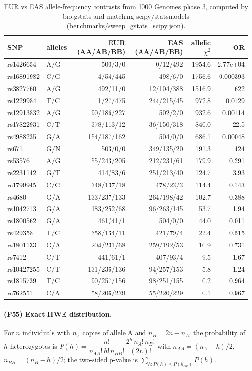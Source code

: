 \begin{table}[h]\centering\small\begin{tabular}{llrrrr}\hline SNP & alleles & EUR (AA/AB/BB) & EAS (AA/AB/BB) & allelic $\chi^2$ & OR\\\hline
rs1426654 & A/G & 500/3/0 & 0/12/492 & 1954.6 & 2.77e+04\\
rs16891982 & C/G & 4/54/445 & 498/6/0 & 1756.6 & 0.000393\\
rs3827760 & A/G & 492/11/0 & 12/104/388 & 1516.9 & 622\\
rs1229984 & T/C & 1/27/475 & 244/215/45 & 972.8 & 0.0129\\
rs12913832 & A/G & 90/186/227 & 502/2/0 & 932.6 & 0.00114\\
rs17822931 & C/T & 378/113/12 & 36/150/318 & 840.0 & 22.5\\
rs4988235 & G/A & 154/187/162 & 504/0/0 & 686.1 & 0.00048\\
rs671 & G/N & 503/0/0 & 349/135/20 & 191.3 & 424\\
rs53576 & A/G & 55/243/205 & 212/231/61 & 179.9 & 0.291\\
rs2231142 & G/T & 414/83/6 & 251/213/40 & 124.7 & 3.93\\
rs1799945 & C/G & 348/137/18 & 478/23/3 & 114.4 & 0.143\\
rs4680 & G/A & 133/237/133 & 264/198/42 & 102.7 & 0.388\\
rs1042713 & G/A & 183/252/68 & 96/263/145 & 53.7 & 1.94\\
rs1800562 & G/A & 461/41/1 & 504/0/0 & 44.0 & 0.011\\
rs429358 & T/C & 358/134/11 & 421/79/4 & 22.4 & 0.515\\
rs1801133 & G/A & 204/231/68 & 259/192/53 & 10.9 & 0.731\\
rs7412 & C/T & 441/61/1 & 407/93/4 & 9.5 & 1.67\\
rs10427255 & C/T & 131/236/136 & 94/257/153 & 5.8 & 1.24\\
rs1815739 & T/C & 90/257/156 & 98/251/155 & 0.2 & 0.964\\
rs762551 & C/A & 58/206/239 & 55/220/229 & 0.1 & 0.967\\
\hline\end{tabular}\caption{EUR vs EAS allele-frequency contrasts from 1000 Genomes phase 3, computed by bio.gstats and matching scipy/statsmodels (benchmarks/sweep\_gstats\_scipy.json).}\end{table}
\paragraph{(F55) Exact HWE distribution.} For $n$ individuals with $n_A$ copies of allele A and $n_B=2n-n_A$, the probability of $h$ heterozygotes is $P(h)=\dfrac{n!}{n_{AA}!\,h!\,n_{BB}!}\,\dfrac{2^{h}\,n_A!\,n_B!}{(2n)!}$ with $n_{AA}=(n_A-h)/2$, $n_{BB}=(n_B-h)/2$; the two-sided p-value is $\sum_{h:P(h)\le P(h_{obs})}P(h)$.
